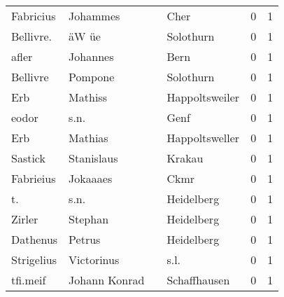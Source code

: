 \begin{tabular}{llllrr}
                Fabricius &                           Johammes &             &                                        Cher &          0 &         1 \\
                Bellivre. &                              äW üe &             &                                   Solothurn &          0 &         1 \\
                    afler &                           Johannes &             &                                        Bern &          0 &         1 \\
                 Bellivre &                            Pompone &             &                                   Solothurn &          0 &         1 \\
                      Erb &                            Mathiss &             &                              Happoltsweiler &          0 &         1 \\
                    eodor &                               s.n. &             &                                        Genf &          0 &         1 \\
                      Erb &                            Mathias &             &                              Happoltsweller &          0 &         1 \\
                  Sastick &                         Stanislaus &             &                                      Krakau &          0 &         1 \\
                Fabrieius &                           Jokaaaes &             &                                        Ckmr &          0 &         1 \\
                       t. &                               s.n. &             &                                  Heidelberg &          0 &         1 \\
                   Zirler &                            Stephan &             &                                  Heidelberg &          0 &         1 \\
                 Dathenus &                             Petrus &             &                                  Heidelberg &          0 &         1 \\
               Strigelius &                         Victorinus &             &                                        s.l. &          0 &         1 \\
                 tfi.meif &                      Johann Konrad &             &                                Schaffhausen &          0 &         1 \\

\end{tabular}
